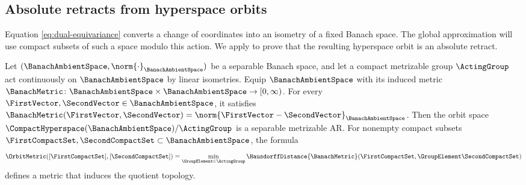 \subsection{Absolute retracts from hyperspace orbits}\label{subsec:ar-hyperspace-orbits}
Equation \eqref{eq:dual-equivariance} converts a change of coordinates into an
isometry of a fixed Banach space.
The global approximation will use compact subsets of such a space
modulo this action.
We apply  to prove that the resulting hyperspace orbit is
an absolute retract.

\begin{theorem}\label{lem:hyperspace-orbit-ar}
Let
$(\BanachAmbientSpace ,\norm{\cdot}_\BanachAmbientSpace )$
be a separable Banach space,
and let a compact metrizable group
$\ActingGroup $
act continuously on
$\BanachAmbientSpace $
by linear isometries.
Equip $\BanachAmbientSpace$ with its induced metric
$\BanachMetric\colon\BanachAmbientSpace\times\BanachAmbientSpace\to[0,\infty)$.
For every $\FirstVector,\SecondVector\in\BanachAmbientSpace$, it satisfies
$\BanachMetric(\FirstVector,\SecondVector)=\norm{\FirstVector-\SecondVector}_\BanachAmbientSpace$.
Then the orbit space
$\CompactHyperspace(\BanachAmbientSpace )/\ActingGroup $
is a separable metrizable AR.
For nonempty compact subsets
$\FirstCompactSet,\SecondCompactSet\subset\BanachAmbientSpace$,
the formula
\begin{equation}\label{eq:orbit-metric}
  \OrbitMetric([\FirstCompactSet ],[\SecondCompactSet ])=\min_{\GroupElement \in \ActingGroup }\HausdorffDistance{\BanachMetric }(\FirstCompactSet ,\GroupElement \SecondCompactSet )
\end{equation}
defines a metric that induces the quotient topology.
\end{theorem}

